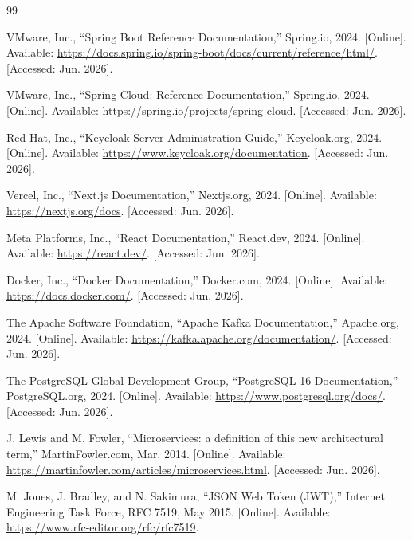\documentclass[12pt,a4paper]{report}
\begin{document}
\cleardoublepage
{}
\begin{thebibliography}{99}
\setlength{\itemsep}{4pt}

VMware, Inc., ``Spring Boot Reference Documentation,'' Spring.io, 2024.
[Online]. Available: \url{https://docs.spring.io/spring-boot/docs/current/reference/html/}.
[Accessed: Jun. 2026].

VMware, Inc., ``Spring Cloud: Reference Documentation,'' Spring.io, 2024.
[Online]. Available: \url{https://spring.io/projects/spring-cloud}.
[Accessed: Jun. 2026].

Red Hat, Inc., ``Keycloak Server Administration Guide,'' Keycloak.org, 2024.
[Online]. Available: \url{https://www.keycloak.org/documentation}.
[Accessed: Jun. 2026].

Vercel, Inc., ``Next.js Documentation,'' Nextjs.org, 2024.
[Online]. Available: \url{https://nextjs.org/docs}. [Accessed: Jun. 2026].

Meta Platforms, Inc., ``React Documentation,'' React.dev, 2024.
[Online]. Available: \url{https://react.dev/}. [Accessed: Jun. 2026].

Docker, Inc., ``Docker Documentation,'' Docker.com, 2024.
[Online]. Available: \url{https://docs.docker.com/}. [Accessed: Jun. 2026].

The Apache Software Foundation, ``Apache Kafka Documentation,'' Apache.org,
2024. [Online]. Available: \url{https://kafka.apache.org/documentation/}.
[Accessed: Jun. 2026].

The PostgreSQL Global Development Group, ``PostgreSQL 16 Documentation,''
PostgreSQL.org, 2024. [Online]. Available:
\url{https://www.postgresql.org/docs/}. [Accessed: Jun. 2026].

J. Lewis and M. Fowler, ``Microservices: a definition of this new architectural
term,'' MartinFowler.com, Mar. 2014. [Online]. Available:
\url{https://martinfowler.com/articles/microservices.html}.
[Accessed: Jun. 2026].

M. Jones, J. Bradley, and N. Sakimura, ``JSON Web Token (JWT),'' Internet
Engineering Task Force, RFC 7519, May 2015. [Online]. Available:
\url{https://www.rfc-editor.org/rfc/rfc7519}.


\end{thebibliography}
\end{document}
